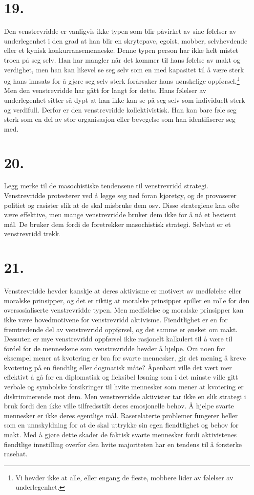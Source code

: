 \documentclass[oneside]{book}
\begin{document}
\section*{19.}
Den venstrevridde er vanligvis ikke typen som blir påvirket av sine følelser av
underlegenhet i den grad at han blir en skrytepave, egoist, mobber,
selvhevdende eller et kynisk konkurransemenneske. Denne typen person har ikke
helt mistet troen på seg selv. Han har mangler når det kommer til hans følelse
av makt og verdighet, men han kan likevel se seg selv som en med kapasitet til
å være sterk og hans innsats for å gjøre seg selv sterk forårsaker hans
uønskelige oppførsel.\footnote{Vi hevder ikke at alle, eller engang de fleste,
mobbere lider av følelser av underlegenhet.} Men den venstrevridde har gått for
langt for dette. Hans følelser av underlegenhet sitter så dypt at han ikke kan
se på seg selv som individuelt sterk og verdifull. Derfor er den venstrevridde
kollektivistisk. Han kan bare føle seg sterk som en del av stor organisasjon
eller bevegelse som han identifiserer seg med.

\section*{20.}
Legg merke til de masochistiske tendensene til venstrevridd strategi.
Venstrevridde protesterer ved å legge seg ned foran kjøretøy, og de provoserer
politiet og rasister slik at de skal misbruke dem osv. Disse strategiene kan
ofte være effektive, men mange venstrevridde bruker dem ikke for å nå et
bestemt mål. De bruker dem fordi de foretrekker masochistisk strategi. Selvhat
er et venstrevridd trekk.

\section*{21.}
Venstrevridde hevder kanskje at deres aktivisme er motivert av medfølelse eller
moralske prinsipper, og det er riktig at moralske prinsipper spiller en rolle
for den oversosialiserte venstrevridde typen. Men medfølelse og moralske
prinsipper kan ikke være hovedmotivene for venstrevridd aktivisme. Fiendtlighet
er en for fremtredende del av venstrevridd oppførsel, og det samme er ønsket om
makt. Dessuten er mye venstrevridd oppførsel ikke rasjonelt kalkulert til å
være til fordel for de menneskene som venstrevridde hevder å hjelpe. Om noen
for eksempel mener at kvotering er bra for svarte mennesker, gir det mening å
kreve kvotering på en fiendtlig eller dogmatisk måte? Åpenbart ville det vært
mer effektivt å gå for en diplomatisk og fleksibel løsning som i det minste
ville gitt verbale og symbolske forsikringer til hvite mennesker som mener at
kvotering er diskriminerende mot dem. Men venstrevridde aktivister tar ikke en
slik strategi i bruk fordi den ikke ville tilfredsstilt deres emosjonelle
behov. Å hjelpe svarte mennesker er ikke deres egentlige mål. Raserelaterte
problemer fungerer heller som en unnskyldning for at de skal uttrykke sin egen
fiendtlighet og behov for makt. Med å gjøre dette skader de faktisk svarte
mennesker fordi aktivistenes fiendtlige innstilling overfor den hvite
majoriteten har en tendens til å forsterke rasehat.
\end{document}
